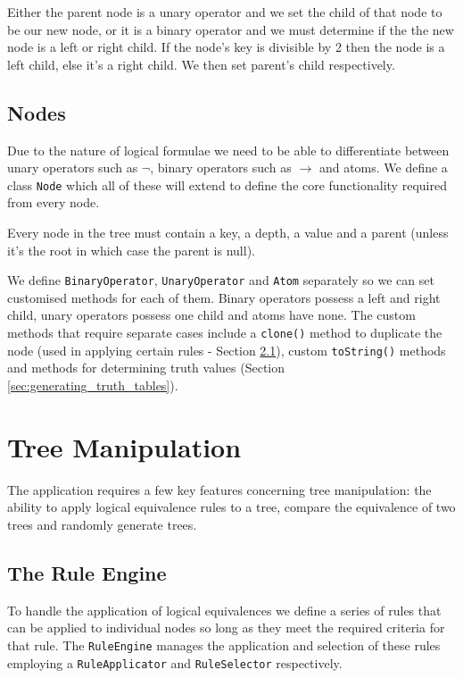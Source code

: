 \documentclass{report}
\begin{document}
Either the parent node is a unary operator and we set the child of that node to be our new node, or it is a binary operator and we must determine if the the new node is a left or right child. If the node's key is divisible by 2 then the node is a left child, else it's a right child. We then set parent's child respectively. 

\section{Nodes}

Due to the nature of logical formulae we need to be able to differentiate between unary operators such as $\lnot$, binary operators such as $\to$ and atoms. We define a class {\tt Node} which all of these will extend to define the core functionality required from every node.

Every node in the tree must contain a key, a depth, a value and a parent (unless it's the root in which case the parent is null).

We define {\tt BinaryOperator}, {\tt UnaryOperator} and {\tt Atom} separately so we can set customised methods for each of them. Binary operators possess a left and right child, unary operators possess one child and atoms have none. The custom methods that require separate cases include a {\tt clone()} method to duplicate the node (used in applying certain rules - Section \ref{sec:the_rule_engine}), custom {\tt toString()} methods and methods for determining truth values (Section \ref{sec:generating_truth_tables}).

\chapter{Tree Manipulation}
\label{chap:tree_manipulation}

The application requires a few key features concerning tree manipulation: the ability to apply logical equivalence rules to a tree, compare the equivalence of two trees and randomly generate trees.

\section{The Rule Engine}
\label{sec:the_rule_engine}

To handle the application of logical equivalences we define a series of rules that can be applied to individual nodes so long as they meet the required criteria for that rule. The {\tt RuleEngine} manages the application and selection of these rules employing a {\tt RuleApplicator} and {\tt RuleSelector} respectively.
\end{document}
